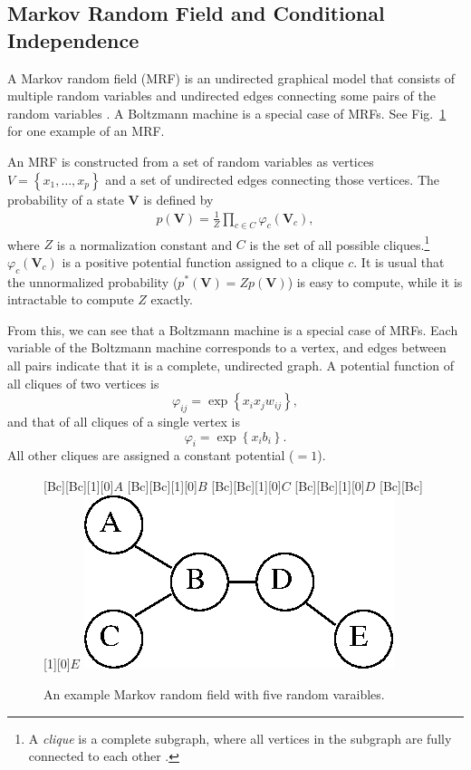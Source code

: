 \documentclass{now}
\newcommand{\matr}[1]{\mathbf{#1}}
\newcommand{\mV}[0]{\matr{V}}
\begin{document}
\subsection{Markov Random Field and Conditional
Independence}
\label{sec:mrf}

A Markov random field (MRF) is an undirected graphical model
that consists of multiple random variables and undirected
edges connecting some pairs of the random variables
\citep[see, e.g.,][]{Kindermann1980}. A Boltzmann machine is
a special case of MRFs. See Fig.~\ref{fig:mrf} for one
example of an MRF.

An MRF is constructed from a set of random variables as
vertices $V=\left\{ x_1, \dots, x_p \right\}$ and a set of
undirected edges connecting those vertices. The probability of
a state $\mV$ is defined by 
\begin{align*}
    p(\mV) = \frac{1}{Z} \prod_{c \in C} \varphi_c
    \left(\mV_c\right),
\end{align*}
where $Z$ is a normalization constant and $C$ is the set of all
possible cliques.\footnote{A \textit{clique} is a complete
subgraph, where all vertices in the subgraph are fully
connected to each other \citep[see, e.g.,][]{Bondy2008}.}
$\varphi_c\left(\mV_c\right)$ is a positive potential
function assigned to a clique $c$. It is usual that the
unnormalized probability ($p^*(\mV) = Z p(\mV)$) is easy to
compute, while it is intractable to compute $Z$ exactly.

From this, we can see that a Boltzmann machine is a special case
of MRFs. Each variable of the Boltzmann machine corresponds to a
vertex, and edges between all pairs indicate that it is a
complete, undirected graph. A potential function of all cliques
of two vertices is
\[
\varphi_{ij} = \exp \left\{ x_i x_j w_{ij} \right\},
\]
and that of all cliques of a single vertex is
\[
\varphi_{i} = \exp \left\{ x_i b_i \right\}.
\]
All other cliques are assigned a constant potential ($=1$).

\begin{figure}[t]
    \centering
    [Bc][Bc][1][0]{$A$}
    [Bc][Bc][1][0]{$B$}
    [Bc][Bc][1][0]{$C$}
    [Bc][Bc][1][0]{$D$}
    [Bc][Bc][1][0]{$E$}
    \includegraphics[width=0.4\columnwidth]{../figures/mrf.eps}
    \caption{An example Markov random field with five random
    varaibles.}
    \label{fig:mrf}
\end{figure}
\end{document}
